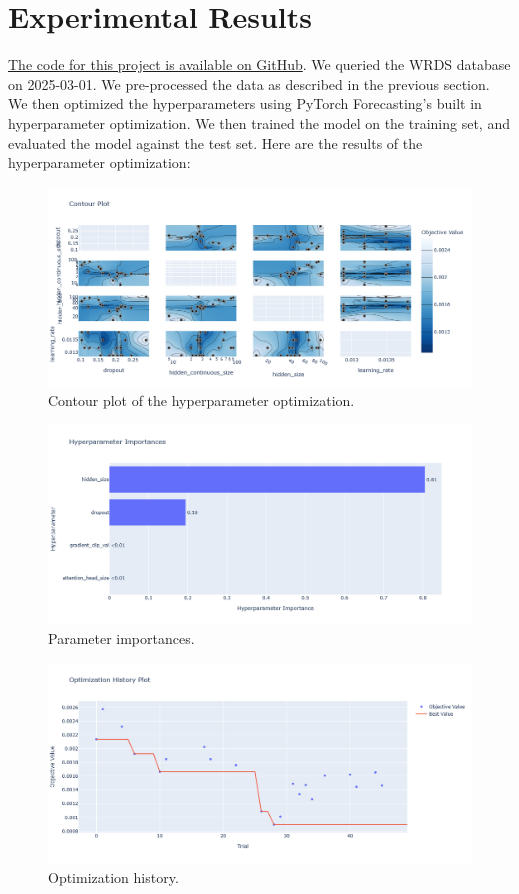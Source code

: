 \documentclass[AER]{AEA}
\begin{document}
\section{Experimental Results}
\href{https://github.com/andrewlys/ECMA-31330}{The code for this project is available on GitHub}. 
We queried the WRDS database on 2025-03-01. We pre-processed the data as described in the previous section.
We then optimized the hyperparameters using PyTorch Forecasting's built in hyperparameter optimization.
We then trained the model on the training set, and evaluated the model against the test set.
Here are the results of the hyperparameter optimization:
\begin{figure}[ht!]
    \includegraphics[scale = 0.3]{contour_plot.png}
    \caption{Contour plot of the hyperparameter optimization.}
    \label{fig:contour}
\end{figure}
\begin{figure}[ht!]
    \includegraphics[scale = 0.3]{parameter_importances.png}
    \caption{Parameter importances.}
    \label{fig:importances}
\end{figure}
\begin{figure}[ht!]
    \includegraphics[scale = 0.3]{optimization_history.png}
    \caption{Optimization history.}
    \label{fig:history}
\end{figure}
\end{document}
